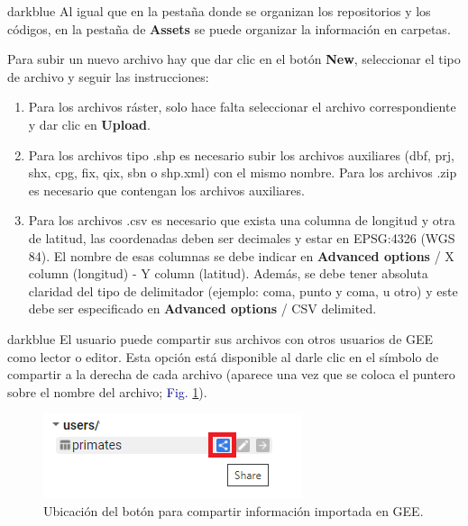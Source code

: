 \documentclass[
  12pt,
  letterpaper,
  twoside]{book}
\providecommand{\tightlist}{%
  \setlength{\itemsep}{0pt}\setlength{\parskip}{0pt}}
\begin{document}
\begin{bluebox2}

\begin{awesomeblock}{5pt}{\faLightbulb}{darkblue}
Al igual que en la pestaña donde se organizan los repositorios y los códigos, en la pestaña de \textbf{Assets} se puede organizar la información en carpetas.

\end{awesomeblock}

\end{bluebox2}

Para subir un nuevo archivo hay que dar clic en el botón \textbf{New}, seleccionar el tipo de archivo y seguir las instrucciones:

\begin{enumerate}
\def\labelenumi{\arabic{enumi}.}
\tightlist
\item
  Para los archivos ráster, solo hace falta seleccionar el archivo correspondiente y dar clic en \textbf{Upload}.
\item
  Para los archivos tipo .shp es necesario subir los archivos auxiliares (dbf, prj, shx, cpg, fix, qix, sbn o shp.xml) con el mismo nombre. Para los archivos .zip es necesario que contengan los archivos auxiliares.
\item
  Para los archivos .csv es necesario que exista una columna de longitud y otra de latitud, las coordenadas deben ser decimales y estar en EPSG:4326 (WGS 84). El nombre de esas columnas se debe indicar en \textbf{Advanced options} / X column (longitud) - Y column (latitud). Además, se debe tener absoluta claridad del tipo de delimitador (ejemplo: coma, punto y coma, u otro) y este debe ser especificado en \textbf{Advanced options} / CSV delimited.
\end{enumerate}

\begin{bluebox2}

\begin{awesomeblock}{5pt}{\faLightbulb}{darkblue}
El usuario puede compartir sus archivos con otros usuarios de GEE como lector o editor. Esta opción está disponible al darle clic en el símbolo de compartir a la derecha de cada archivo (aparece una vez que se coloca el puntero sobre el nombre del archivo; \textcolor{darkblue}{Fig.} \ref{fig:f45}).

\end{awesomeblock}

\end{bluebox2}

\begin{figure}[H]

{\centering \includegraphics[width=0.5\linewidth]{Img/shareAssets} 

}

\caption{Ubicación del botón para compartir información importada en GEE.}\label{fig:f45}
\end{figure}
\end{document}

